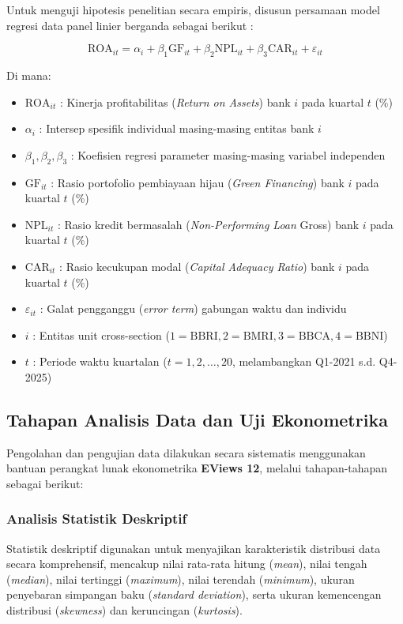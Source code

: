 \documentclass[12pt,a4paper]{article}
\numberwithin{equation}{section}
\begin{document}
\noindent
Untuk menguji hipotesis penelitian secara empiris, disusun persamaan model regresi data panel linier berganda sebagai berikut \citep{GujaratiPorter2020, Wooldridge2020}:

\begin{equation}
  \text{ROA}_{it} = \alpha_i + \beta_1 \text{GF}_{it} + \beta_2 \text{NPL}_{it} + \beta_3 \text{CAR}_{it} + \varepsilon_{it}
  \label{eq:regresi_panel}
\end{equation}

\noindent Di mana:
\begin{itemize}
  \item $\text{ROA}_{it}$ : Kinerja profitabilitas (\emph{Return on Assets}) bank $i$ pada kuartal $t$ (\%)
  \item $\alpha_i$ : Intersep spesifik individual masing-masing entitas bank $i$
  \item $\beta_1, \beta_2, \beta_3$ : Koefisien regresi parameter masing-masing variabel independen
  \item $\text{GF}_{it}$ : Rasio portofolio pembiayaan hijau (\emph{Green Financing}) bank $i$ pada kuartal $t$ (\%)
  \item $\text{NPL}_{it}$ : Rasio kredit bermasalah (\emph{Non-Performing Loan} Gross) bank $i$ pada kuartal $t$ (\%)
  \item $\text{CAR}_{it}$ : Rasio kecukupan modal (\emph{Capital Adequacy Ratio}) bank $i$ pada kuartal $t$ (\%)
  \item $\varepsilon_{it}$ : Galat pengganggu (\emph{error term}) gabungan waktu dan individu
  \item $i$ : Entitas unit cross-section ($1 = \text{BBRI}, 2 = \text{BMRI}, 3 = \text{BBCA}, 4 = \text{BBNI}$)
  \item $t$ : Periode waktu kuartalan ($t = 1, 2, \dots, 20$, melambangkan Q1-2021 s.d. Q4-2025)
\end{itemize}

\subsection{Tahapan Analisis Data dan Uji Ekonometrika}

\noindent
Pengolahan dan pengujian data dilakukan secara sistematis menggunakan bantuan perangkat lunak ekonometrika \textbf{EViews 12}, melalui tahapan-tahapan sebagai berikut:

\subsubsection{Analisis Statistik Deskriptif}
\noindent
Statistik deskriptif digunakan untuk menyajikan karakteristik distribusi data secara komprehensif, mencakup nilai rata-rata hitung (\emph{mean}), nilai tengah (\emph{median}), nilai tertinggi (\emph{maximum}), nilai terendah (\emph{minimum}), ukuran penyebaran simpangan baku (\emph{standard deviation}), serta ukuran kemencengan distribusi (\emph{skewness}) dan keruncingan (\emph{kurtosis}).
\end{document}
